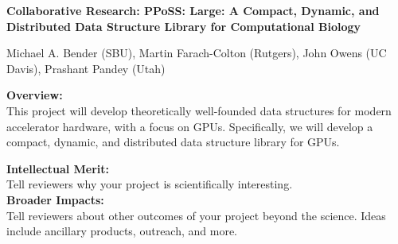 
\begin{center}
\bf
\Large
Collaborative Research: PPoSS: Large: A Compact, Dynamic, and Distributed Data
Structure Library for Computational Biology

\medskip
\small
Michael A. Bender (SBU), Martin Farach-Colton (Rutgers), John Owens (UC Davis),
Prashant Pandey (Utah)
\end{center}


\noindent \textbf{\large Overview:}\\

\noindent This project will develop theoretically well-founded data structures for modern accelerator hardware, with a focus on GPUs. Specifically, we will develop a compact, dynamic, and distributed data structure library for GPUs.


\noindent \textbf{\large Intellectual Merit:}\\

\noindent Tell reviewers why your project is scientifically interesting.\\

\noindent \textbf{\large Broader Impacts: }\\

\noindent Tell reviewers about other outcomes of your project beyond the science. Ideas include ancillary products, outreach, and more.
